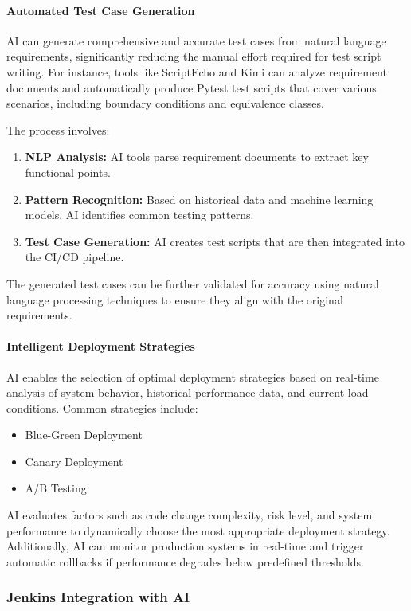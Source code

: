 \documentclass[manuscript,screen,review]{acmart}
\begin{document}
\paragraph{Automated Test Case Generation}
AI can generate comprehensive and accurate test cases from natural language requirements, significantly reducing the manual effort required for test script writing. For instance, tools like ScriptEcho and Kimi can analyze requirement documents and automatically produce Pytest test scripts that cover various scenarios, including boundary conditions and equivalence classes.

The process involves:
\begin{enumerate}
    \item \textbf{NLP Analysis:} AI tools parse requirement documents to extract key functional points.
    \item \textbf{Pattern Recognition:} Based on historical data and machine learning models, AI identifies common testing patterns.
    \item \textbf{Test Case Generation:} AI creates test scripts that are then integrated into the CI/CD pipeline.
\end{enumerate}

The generated test cases can be further validated for accuracy using natural language processing techniques to ensure they align with the original requirements.

\paragraph{Intelligent Deployment Strategies}
AI enables the selection of optimal deployment strategies based on real-time analysis of system behavior, historical performance data, and current load conditions. Common strategies include:
\begin{itemize}
    \item Blue-Green Deployment
    \item Canary Deployment
    \item A/B Testing
\end{itemize}

AI evaluates factors such as code change complexity, risk level, and system performance to dynamically choose the most appropriate deployment strategy. Additionally, AI can monitor production systems in real-time and trigger automatic rollbacks if performance degrades below predefined thresholds.

\subsubsection{Jenkins Integration with AI}
\end{document}
